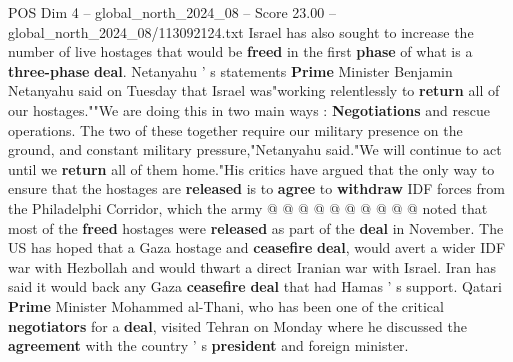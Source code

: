 \begin{textsample}{POS Dim 4 – global\_north\_2024\_08 – Score 23.00 – global\_north\_2024\_08/113092124.txt}
Israel has also sought to increase the number of live hostages that would be \textbf{freed} in the first \textbf{phase} of what is a \textbf{three-phase} \textbf{deal}.
Netanyahu ' s statements \textbf{Prime} Minister Benjamin Netanyahu said on Tuesday that Israel was"working relentlessly to \textbf{return} all of our hostages.""We are doing this in two main ways : \textbf{Negotiations} and rescue operations.
The two of these together require our military presence on the ground, and constant military pressure,"Netanyahu said."We will continue to act until we \textbf{return} all of them home."His critics have argued that the only way to ensure that the hostages are \textbf{released} is to \textbf{agree} to \textbf{withdraw} IDF forces from the Philadelphi Corridor, which the army @ @ @ @ @ @ @ @ @ @ noted that most of the \textbf{freed} hostages were \textbf{released} as part of the \textbf{deal} in November.
The US has hoped that a Gaza hostage and \textbf{ceasefire} \textbf{deal}, would avert a wider IDF war with Hezbollah and would thwart a direct Iranian war with Israel.
Iran has said it would back any Gaza \textbf{ceasefire} \textbf{deal} that had Hamas ' s support.
Qatari \textbf{Prime} Minister Mohammed al-Thani, who has been one of the critical \textbf{negotiators} for a \textbf{deal}, visited Tehran on Monday where he discussed the \textbf{agreement} with the country ' s \textbf{president} and foreign minister.

\end{textsample}
